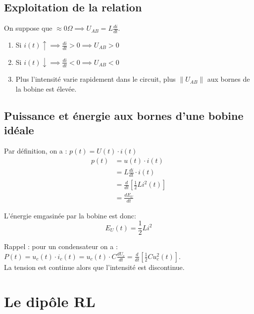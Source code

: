 \subsection{Exploitation de la relation}

On suppose que \(\approx 0 \Omega \implies U_{AB} = L\frac{di}{dt}\).\\
\begin{enumerate}
    \item Si \(i(t) \uparrow \implies \frac{di}{dt} >0 \implies  U_{AB} >0\)
    \item Si \(i(t) \downarrow \implies \frac{di}{dt}<0 \implies U_{AB}<0\)
    \item Plus l'intensité varie rapidement dans le circuit, plus \(\lVert U_{AB} \rVert \) aux bornes de la bobine est élevée.   
\end{enumerate} 

\subsection{Puissance et énergie aux bornes d'une bobine idéale}
Par définition, on a : \(p(t) = U(t) \cdot i(t)\)
\begin{align}
    p(t) &= u(t) \cdot i(t)\\
    &= L \frac{di}{dt} \cdot i(t) \\
    &= \frac{d}{dt}\left[ \frac{1}{2} Li^{2}(t) \right]\\
    &= \frac{dE_{U}}{dt}
\end{align} 

L'énergie emgasinée par la bobine est donc:
\[
    E_{U}(t) = \frac{1}{2}Li^{2}
\]

Rappel : pour un condensateur on a : \(P(t) = u_{c}(t) \cdot i_{c}(t) = u_{c}(t) \cdot C \frac{dU_{c}}{dt} = \frac{d}{dt}\left[ \frac{1}{2}Cu_{c}^{2}(t) \right]\).\\
La tension est continue alors que l'intensité est discontinue.
\section{Le dipôle RL}

